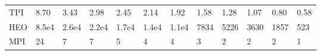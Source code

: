 \begin{table*}
{\begin{tabular}{llllllllllll}
TPI      &             8.70 &               3.43 &               2.98 &               2.45 &             2.14 &             1.92 &             1.58 &             1.28 &             1.07 &            0.80 &             0.58 \\
HEO      &            8.5e4 &              2.6e4 &              2.2e4 &              1.7e4 &            1.4e4 &            1.1e4 &             7834 &             5226 &             3630 &            1857 &              523 \\
MPI      &               24 &                  7 &                  7 &                  5 &                4 &                4 &                3 &                2 &                2 &               2 &                1 \\
\bottomrule
\end{tabular}}
\end{table*}
